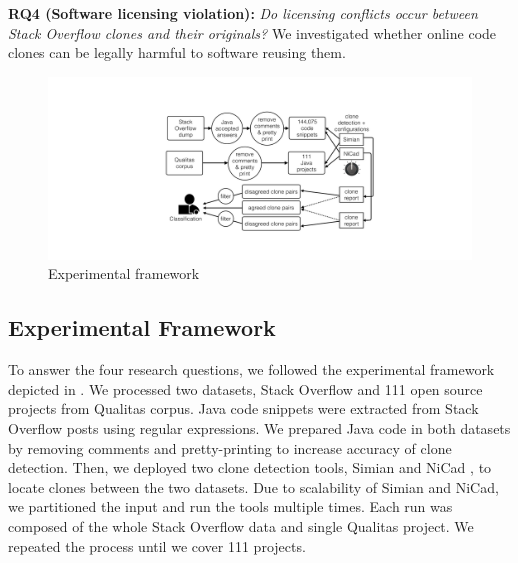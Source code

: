 \documentclass[sigconf,review, anonymous]{acmart}
\begin{document}
\textbf{RQ4 (Software licensing violation):} \textit{Do licensing conflicts occur between Stack Overflow clones and their originals?} We investigated whether online code clones can be legally harmful to software reusing them.

\begin{figure}
	\centering
	\includegraphics[width=\linewidth]{exp_framework_new}
	\caption{Experimental framework}
	\label{fig:exp_framework}
\end{figure}

\subsection{Experimental Framework}
To answer the four research questions, we followed the experimental framework depicted in . We processed two datasets, Stack Overflow and 111 open source projects from Qualitas corpus. Java code snippets were extracted from Stack Overflow posts using regular expressions. We prepared Java code in both datasets by removing comments and pretty-printing to increase accuracy of clone detection. Then, we deployed two clone detection tools, Simian \cite{simian} and NiCad \cite{Roy2008,Cordy}, to locate clones between the two datasets. Due to scalability of Simian and NiCad, we partitioned the input and run the tools multiple times. Each run was composed of the whole Stack Overflow data and single Qualitas project. We repeated the process until we cover 111 projects. 
\end{document}

